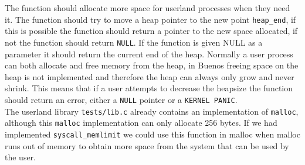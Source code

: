 \documentclass[11pt]{article}
\begin{document}
    The function should allocate more space for userland processes when they
    need it.  The function should try to move a heap pointer to the new point
    \texttt{heap_end}, if this is possible the function should return a pointer
    to the new space allocated, if not the function should return \texttt{NULL}.
    If the function is given NULL as a parameter it should return the current
    end of the heap.  Normally a user process can both allocate and free memory
    from the heap, in Buenos freeing space on the heap is not implemented and
    therefore the heap can always only grow and never shrink.  This means that
    if a user attempts to decrease the heapsize the function should return an
    error, either a \texttt{NULL} pointer or a \texttt{KERNEL PANIC}.  \\

    The userland library \texttt{tests/lib.c} already contains an implementation
    of \texttt{malloc}, although this \texttt{malloc} implementation can only
    allocate 256 bytes.  If we had implemented \texttt{syscall_memlimit} we
    could use this function in malloc when malloc runs out of memory to obtain
    more space from the system that can be used by the user.
\end{document}
